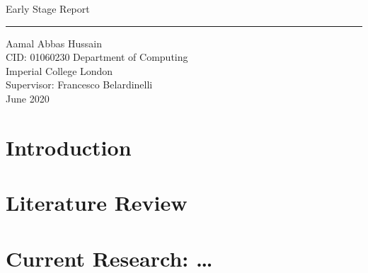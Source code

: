 \documentclass[11pt]{report}
\begin{document}
\clearpage\thispagestyle{empty}
\begin{titlepage}

	\flushright
    \hfill
    \vfill
	{\Huge Early Stage Report \par} 
	\rule[5pt]{\textwidth}{.4pt} \par
	{\Large Aamal Abbas Hussain \\ CID: 01060230}
	\vfill 
    {\Large Department of Computing\\Imperial College London\\Supervisor: Francesco Belardinelli\\
	June 2020 \\}
\end{titlepage}



\tableofcontents

\chapter{Introduction}  \label{ch::Intro}

\chapter{Literature Review}  \label{ch::Lit_Review}

\chapter{Current Research: \ldots}  \label{ch::ShortTermGoals}
\end{document}
